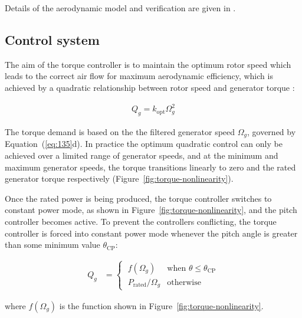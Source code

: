 \documentclass[a4paper,preprint]{elsarticle}
\newcommand{\mathup}{\mathrm}
\begin{document}
Details of the aerodynamic model and verification are given in
\citet{lupton_frequencydomain_2015}.

\subsection{Control system}
\label{sec:torque-control}

The aim of the torque controller is to maintain the optimum rotor speed which
leads to the correct air flow for maximum aerodynamic efficiency, which is
achieved by a quadratic relationship between rotor speed and generator torque
\citep[chapter~8]{Burton2011}:
\begin{linenomath}\begin{align}
  \label{eq:157}
  Q_g = k_{\mathup{opt}} \Omega_g^2
\end{align}\end{linenomath}
The torque demand is based on the the filtered generator speed $\Omega_g$, governed
by Equation~(\ref{eq:135}d). In practice the optimum quadratic control can only
be achieved over a limited range of generator speeds, and at the minimum and
maximum generator speeds, the torque transitions linearly to zero and the rated
generator torque respectively (Figure~\ref{fig:torque-nonlinearity}).

Once the rated power is being produced, the torque controller switches to
constant power mode, as shown in Figure~\ref{fig:torque-nonlinearity}, and the
pitch controller becomes active. To prevent the controllers conflicting, the
torque controller is forced into constant power mode whenever the pitch angle is
greater than some minimum value $\theta{}_{\mathup{CP}}$:
\begin{linenomath}\begin{align}
  \label{eq:195}
  Q_g &= \begin{cases}
    \; f(\Omega_g) & \text{when $\theta{} \le \theta{}_{\mathup{CP}}$} \\
    \; P_{\mathup{rated}} / \Omega_g & \text{otherwise}
  \end{cases}
\end{align}\end{linenomath}
where $f(\Omega_g)$ is the function shown in Figure~\ref{fig:torque-nonlinearity}.
\end{document}
